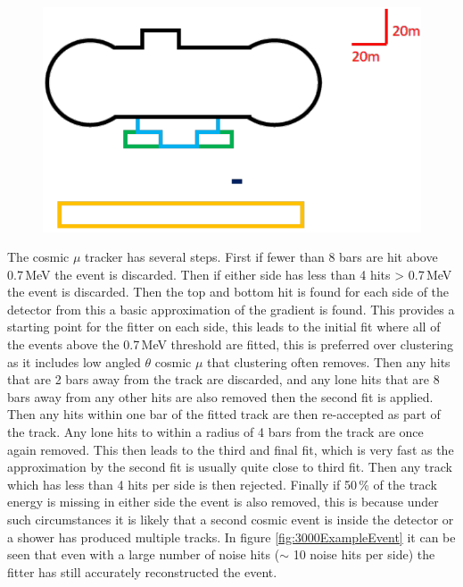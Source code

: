 \begin{figure}[H]
 \centering
 \includegraphics[width=\linewidth]{Chapter5/Figs/Raster/wylfaTraceStep4.png}
 \label{fig:wylfaTraceStep4}
\end{figure}

The cosmic $\mu$ tracker has several steps. First if fewer than 8 bars are hit above 0.7\,MeV the event is discarded. Then if either side has less than 4 hits > 0.7\,MeV the event is discarded. Then the top and bottom hit is found for each side of the detector from this a basic approximation of the gradient is found. This provides a starting point for the fitter on each side, this leads to the initial fit where all of the events above the 0.7\,MeV threshold are fitted, this is preferred over clustering as it includes low angled $\theta$ cosmic $\mu$ that clustering often removes. Then any hits that are 2 bars away from the track are discarded, and any lone hits that are 8 bars away from any other hits are also removed then the second fit is applied. Then any hits within one bar of the fitted track are then re-accepted as part of the track. Any lone hits to within a radius of 4 bars from the track are once again removed. This then leads to the third and final fit, which is very fast as the approximation by the second fit is usually quite close to third fit. Then any track which has less than 4 hits per side is then rejected. Finally if 50\,\% of the track energy is missing in either side the event is also removed, this is because under such circumstances it is likely that a second cosmic event is inside the detector or a shower has produced multiple tracks. In figure \ref{fig:3000ExampleEvent} it can be seen that even with a large number of noise hits ($\sim$ 10 noise hits per side) the fitter has still accurately reconstructed the event. 
 
